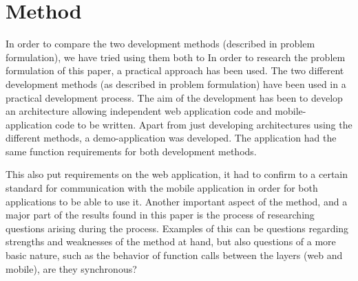 \documentclass{./tex/cslthse-msc}
\begin{document}
\section{Method}
In order to compare the two development methods (described in problem formulation), we have tried using them both to 
In order to research the problem formulation of this paper, a practical approach has been used. The two different development methods (as described in problem formulation) have been used in a practical development process. The aim of the development has been to develop an architecture allowing independent web application code and mobile-application code to be written.
\newline\newline
Apart from just developing architectures using the different methods, a demo-application was developed. The application had the same function requirements for both development methods. 

This also put requirements on the web application, it had to confirm to a certain standard for communication with the mobile application in order for both applications to be able to use it. 
\newline\newline
Another important aspect of the method, and a major part of the results found in this paper is the process of researching questions arising during the process. Examples of this can be questions regarding strengths and weaknesses of the method at hand, but also questions of a more basic nature, such as the behavior of function calls between the layers (web and mobile), are they synchronous?
\end{document}
